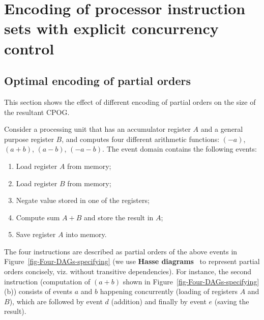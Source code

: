 \chapter{Encoding of processor instruction sets with explicit concurrency control}

\label{chap:PGEncoding}

\section{Optimal encoding of partial orders\label{sec:Optimal-encoding-problem}}

This section shows the effect of different encoding of partial orders
on the size of the resultant CPOG.

Consider a processing unit that has an accumulator register $A$ and
a general purpose register $B$, and computes four different arithmetic
functions: $(-a)$, $(a+b)$, $(a-b)$, $(-a-b)$. The event domain
contains the following events:

\renewcommand{\labelenumi}{\alph{enumi})}
\begin{enumerate}
\item Load register $A$ from memory;
\item Load register $B$ from memory;
\item Negate value stored in one of the registers;
\item Compute sum $A+B$ and store the result in $A$;
\item Save register $A$ into memory.
\end{enumerate}
The four instructions are described as partial orders of the above
events in Figure~\ref{fig-Four-DAGs-specifying} (we use \textbf{Hasse
diagrams}~\cite{1967_birkhoff_} to represent partial orders concisely,
viz. without transitive dependencies). For instance, the second instruction
(computation of $(a+b)$ shown in Figure~\ref{fig-Four-DAGs-specifying}(b))
consists of events $a$ and $b$ happening concurrently (loading of
registers $A$ and $B$), which are followed by event $d$ (addition)
and finally by event $e$ (saving the result).

